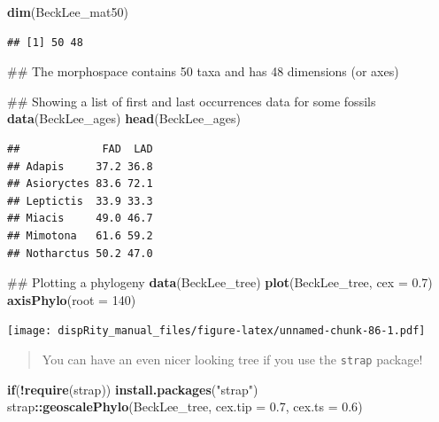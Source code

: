 \documentclass[]{book}
\newenvironment{Shaded}{\begin{snugshade}}{\end{snugshade}}
\newcommand{\KeywordTok}[1]{\textcolor[rgb]{0.13,0.29,0.53}{\textbf{#1}}}
\newcommand{\DataTypeTok}[1]{\textcolor[rgb]{0.13,0.29,0.53}{#1}}
\newcommand{\DecValTok}[1]{\textcolor[rgb]{0.00,0.00,0.81}{#1}}
\newcommand{\FloatTok}[1]{\textcolor[rgb]{0.00,0.00,0.81}{#1}}
\newcommand{\StringTok}[1]{\textcolor[rgb]{0.31,0.60,0.02}{#1}}
\newcommand{\ControlFlowTok}[1]{\textcolor[rgb]{0.13,0.29,0.53}{\textbf{#1}}}
\newcommand{\OperatorTok}[1]{\textcolor[rgb]{0.81,0.36,0.00}{\textbf{#1}}}
\newcommand{\NormalTok}[1]{#1}
\theoremstyle{definition}
\theoremstyle{definition}
\theoremstyle{remark}
\begin{document}
\begin{Shaded}
\begin{Highlighting}[]
\KeywordTok{dim}\NormalTok{(BeckLee_mat50)}
\end{Highlighting}
\end{Shaded}

\begin{verbatim}
## [1] 50 48
\end{verbatim}

\begin{Shaded}
\begin{Highlighting}[]
\NormalTok{## The morphospace contains 50 taxa and has 48 dimensions (or axes)}

\NormalTok{## Showing a list of first and last occurrences data for some fossils}
\KeywordTok{data}\NormalTok{(BeckLee_ages)}
\KeywordTok{head}\NormalTok{(BeckLee_ages)}
\end{Highlighting}
\end{Shaded}

\begin{verbatim}
##             FAD  LAD
## Adapis     37.2 36.8
## Asioryctes 83.6 72.1
## Leptictis  33.9 33.3
## Miacis     49.0 46.7
## Mimotona   61.6 59.2
## Notharctus 50.2 47.0
\end{verbatim}

\begin{Shaded}
\begin{Highlighting}[]
\NormalTok{## Plotting a phylogeny}
\KeywordTok{data}\NormalTok{(BeckLee_tree)}
\KeywordTok{plot}\NormalTok{(BeckLee_tree, }\DataTypeTok{cex =} \FloatTok{0.7}\NormalTok{)}
\KeywordTok{axisPhylo}\NormalTok{(}\DataTypeTok{root =} \DecValTok{140}\NormalTok{)}
\end{Highlighting}
\end{Shaded}

\texttt{[image: dispRity\_manual\_files/figure-latex/unnamed-chunk-86-1.pdf]}

\begin{quote}
You can have an even nicer looking tree if you use the \texttt{strap}
package!
\end{quote}

\begin{Shaded}
\begin{Highlighting}[]
\ControlFlowTok{if}\NormalTok{(}\OperatorTok{!}\KeywordTok{require}\NormalTok{(strap)) }\KeywordTok{install.packages}\NormalTok{(}\StringTok{"strap"}\NormalTok{)}
\NormalTok{strap}\OperatorTok{::}\KeywordTok{geoscalePhylo}\NormalTok{(BeckLee_tree, }\DataTypeTok{cex.tip =} \FloatTok{0.7}\NormalTok{, }\DataTypeTok{cex.ts =} \FloatTok{0.6}\NormalTok{)}
\end{Highlighting}
\end{Shaded}
\end{document}
